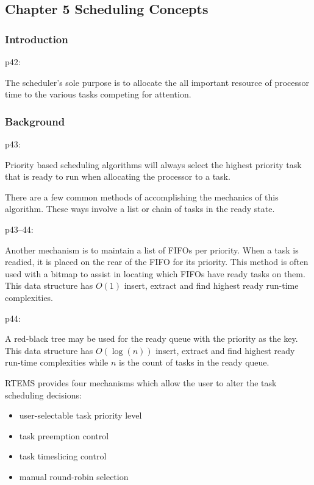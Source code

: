 \subsection{Chapter 5 Scheduling Concepts}

\subsubsection{Introduction}

p42:

The scheduler’s sole purpose is to allocate
the  all important resource of processor time
to the various tasks competing for attention.

\subsubsection{Background}

p43:

Priority based scheduling algorithms will always select
the highest priority task that is ready to run
when allocating the processor to a task.

There are a few common methods of accomplishing the mechanics of this algorithm.
These ways involve a list or chain of tasks in the ready state.

p43--44:

Another mechanism is to maintain a list of FIFOs per priority.
When a task is readied,
it is placed on the rear of the FIFO for its priority.
This method is often used with a bitmap to assist in locating
which FIFOs have ready tasks on them.
This data structure has $O(1)$ insert, extract
and find highest ready run-time complexities.

p44:

A red-black tree may be used for the ready queue with the priority as the key.
This data structure has $O(\log(n))$ insert, extract
and find highest ready run-time complexities
while $n$ is the count of tasks in the ready queue.

RTEMS provides four mechanisms which allow the user to alter the task scheduling decisions:
\begin{itemize}
  \item
    user-selectable task priority level
  \item
    task preemption control
  \item
    task timeslicing control
  \item
    manual round-robin selection
\end{itemize}

